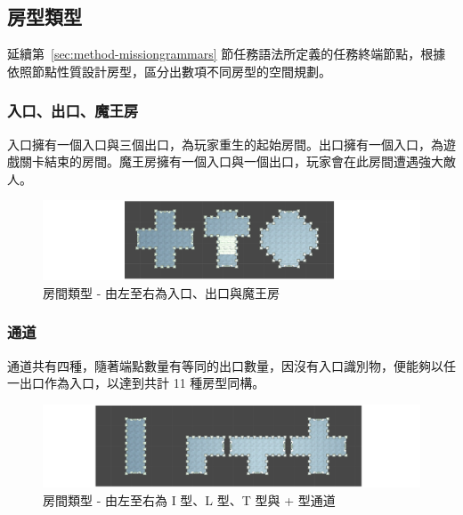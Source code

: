 \subsection{房型類型}
\label{ssec:method-spacepieces-types}

延續第~\ref{sec:method-missiongrammars} 節任務語法所定義的任務終端節點，根據依照節點性質設計房型，區分出數項不同房型的空間規劃。

\subsubsection{入口、出口、魔王房}
\label{sssec:method-spacepieces-types-mainpath-i}

入口擁有一個入口與三個出口，為玩家重生的起始房間。出口擁有一個入口，為遊戲關卡結束的房間。魔王房擁有一個入口與一個出口，玩家會在此房間遭遇強大敵人。

\begin{figure}[ht]
  \begin{center}
    \includegraphics[width=1.0\textwidth]{figures/roomtype-mainpath-i.png}
    \caption{房間類型 - 由左至右為入口、出口與魔王房}
    \label{fig:roomtype-mainpath-i}
  \end{center}
\end{figure}

\subsubsection{通道}
\label{sssec:method-spacepieces-types-path}

通道共有四種，隨著端點數量有等同的出口數量，因沒有入口識別物，便能夠以任一出口作為入口，以達到共計 11 種房型同構。

\begin{figure}[ht]
  \begin{center}
    \includegraphics[width=1.0\textwidth]{figures/roomtype-mainpath-ii.png}
    \caption{房間類型 - 由左至右為 I 型、L 型、T 型與 + 型通道}
    \label{fig:roomtype-mainpath-ii}
  \end{center}
\end{figure}

